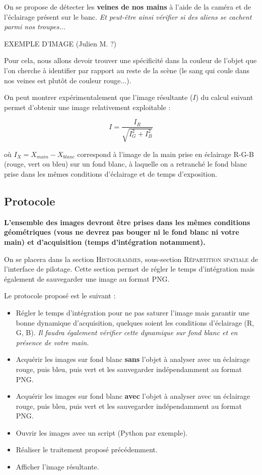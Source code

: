 \documentclass[a4paper,11pt,titlepage]{article} %
\begin{document}
On se propose de détecter les \textbf{veines de nos mains} à l'aide de la caméra et de l'éclairage présent sur le banc. \textit{Et peut-être ainsi vérifier si des aliens se cachent parmi nos troupes...}

EXEMPLE D'IMAGE (Julien M. ?)

Pour cela, nous allons devoir trouver une spécificité dans la couleur de l'objet que l'on cherche à identifier par rapport au reste de la scène (le sang qui coule dans nos veines est plutôt de couleur rouge...).

On peut montrer expérimentalement que l'image résultante ($I$) du calcul suivant permet d'obtenir une image relativement exploitable :

$$I = \frac{I_R}{\sqrt{I_G^2 + I_B^2}}$$

où $I_X = X_{main} - X_{blanc}$ correspond à l'image de la main prise en éclairage R-G-B (rouge, vert ou bleu) sur un fond blanc, à laquelle on a retranché le fond blanc prise dans les mêmes conditions d'éclairage et de temps d'exposition.

\subsection{Protocole}

\textbf{L'ensemble des images devront être prises dans les mêmes conditions géométriques (vous ne devrez pas bouger ni le fond blanc ni votre main) et d'acquisition (temps d'intégration notamment).}

On se placera dans la section \textsc{Histogrammes}, sous-section \textsc{Répartition spatiale} de l'interface de pilotage. Cette section permet de régler le temps d'intégration mais également de sauvegarder une image au format PNG.

\medskip

Le protocole proposé est le suivant :

\begin{itemize}
	\item Régler le temps d'intégration pour ne pas saturer l'image mais garantir une bonne dynamique d'acquisition, quelques soient les conditions d'éclairage (R, G, B). \textit{Il faudra également vérifier cette dynamique sur fond blanc et en présence de votre main.}
	\item Acquérir les images sur fond blanc \textbf{sans} l'objet à analyser avec un éclairage rouge, puis bleu, puis vert et les sauvegarder indépendamment au format PNG.
	\item Acquérir les images sur fond blanc \textbf{avec} l'objet à analyser avec un éclairage rouge, puis bleu, puis vert et les sauvegarder indépendamment au format PNG.
	\item Ouvrir les images avec un script (Python par exemple).
	\item Réaliser le traitement proposé précédemment.
	\item Afficher l'image résultante.
\end{itemize}
\end{document}
